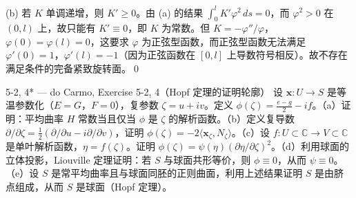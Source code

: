 \begin{solution}
(b) 若 $K$ 单调递增，则 $K' \geq 0$。由 (a) 的结果 $\int_0^l K'\varphi^2\,ds = 0$，而 $\varphi^2 > 0$ 在 $(0,l)$ 上，故只能有 $K' \equiv 0$，即 $K$ 为常数。但 $K = -\varphi''/\varphi$，$\varphi(0)=\varphi(l)=0$，这要求 $\varphi$ 为正弦型函数，而正弦型函数无法满足 $\varphi'(0)=1$，$\varphi'(l)=-1$（因为正弦函数在 $[0,l]$ 上导数符号相反）。故不存在满足条件的完备紧致旋转面。\qed
\end{solution}

\begin{exercise}{5-2, 4* — do Carmo, Exercise 5-2, 4（Hopf 定理的证明轮廓）}
设 $\mathbf{x}: U \to S$ 是等温参数化（$E=G$，$F=0$），复参数 $\zeta = u+iv$。定义 $\phi(\zeta) = \frac{e-g}{2} - if$。（a）证明：平均曲率 $H$ 常数当且仅当 $\phi$ 是 $\zeta$ 的解析函数。（b）定义复导数 $\partial/\partial\zeta = \frac{1}{2}(\partial/\partial u - i\partial/\partial v)$，证明 $\phi(\zeta) = -2\langle \mathbf{x}_\zeta, N_\zeta\rangle$。（c）设 $f: U \subset \mathbb{C} \to V \subset \mathbb{C}$ 是单叶解析函数，$\eta = f(\zeta)$。证明 $\phi(\zeta) = \psi(\eta)(\partial\eta/\partial\zeta)^2$。（d）利用球面的立体投影，Liouville 定理证明：若 $S$ 与球面共形等价，则 $\phi \equiv 0$，从而 $\psi \equiv 0$。（e）设 $S$ 是常平均曲率且与球面同胚的正则曲面，利用上述结果证明 $S$ 是由脐点组成，从而 $S$ 是球面（Hopf 定理）。
\end{exercise}
